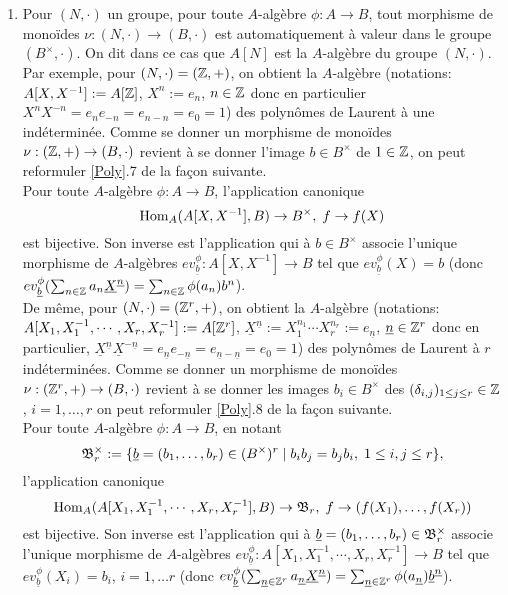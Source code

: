 \begin{enumerate}[leftmargin=* ,parsep=0cm,itemsep=0cm,topsep=0cm]
 
 \item Pour $(N,\cdot)$ un groupe, pour toute $A$-algèbre $\phi:A\rightarrow B$, tout morphisme de monoïdes $\nu:(N,\cdot)\rightarrow (B,\cdot)$ est automatiquement à valeur dans le groupe $(B^\times,\cdot)$. On dit dans ce cas que $ A[N]$ est la $A$-algèbre du groupe $(N,\cdot)$.\\
 
  Par exemple, pour $(N,\cdot)=(\mathbb{Z},+)$, on obtient la $A$-algèbre (notations:  $A[X,X^{-1}]:=A[\mathbb{Z}]$, $X^n:=e_n$, $n\in \mathbb{Z}$ donc en particulier $X^nX^{-n}=e_ne_{-n}=e_{n-n}=e_0=1$) des polynômes de Laurent à une indéterminée. Comme se donner    un morphisme de monoïdes $\nu:(\mathbb{Z},+)\rightarrow (B ,\cdot)$ revient à se donner l'image  $b \in B^\times $ de $1\in \mathbb{Z}$, on peut reformuler \ref{Poly}.7 de la fa\c{c}on suivante.\\

   Pour toute $A$-algèbre $\phi:A\rightarrow B$,  l'application canonique
$$\hbox{\rm Hom}_A(A[X,X^{-1}],B)\rightarrow B^\times,\; f\rightarrow f(X)$$
 est bijective. Son inverse est l'application qui à $b \in B^\times$ associe l'unique morphisme de $A$-algèbres $ev_{\underline{b}}^\phi:A[X,X^{-1}]\rightarrow B$ tel que $ev_{\underline{b}}^\phi(X)=b$ (donc $ev_{\underline{b}}^\phi(\sum_{n\in \mathbb{Z}}a_n\underline{X}^{\underline{n}})=\sum_{n\in \mathbb{Z}}\phi(a_n)b^n$).\\ 
 
  De même, pour $(N,\cdot)=(\mathbb{Z}^r,+)$, on obtient la $A$-algèbre (notations:  $A[X_1,X_1^{-1},\cdots, X_r,X_r^{-1}]:=A[\mathbb{Z}^r]$, $\underline{X}^{\underline{n}}:=X_1^{n_1}\cdots X_r^{n_r}:=e_{\underline{n}}$, $\underline{n}\in \mathbb{Z}^r$ donc en particulier, $\underline{X}^{\underline{n}}\underline{X}^{-\underline{n}}= e_{\underline{n}}e_{-\underline{n}}=e_{\underline{n}-\underline{n}}=e_0=1$) des polynômes de Laurent à $r$ indéterminées. Comme se donner    un morphisme de monoïdes $\nu:(\mathbb{Z}^r,+)\rightarrow (B ,\cdot)$ revient à se donner les images $b_i \in B^\times $ des $(\delta_{i,j})_{1\leq j\leq r}\in \mathbb{Z}$, $i=1,\dots, r$ on peut reformuler \ref{Poly}.8 de la fa\c{c}on suivante.\\
 
   Pour toute $A$-algèbre $\phi:A\rightarrow B$, en notant  
 $$\frak{B}^\times_r:= \lbrace \underline{b}=(b_1,\dots, b_r)\in (B^\times)^r\;|\; b_ib_j=b_jb_i,\; 1\leq i,j\leq r\rbrace,$$  l'application canonique
$$\hbox{\rm Hom}_A(A[X_1,X_1^{-1},\cdots, X_r,X_r^{-1}],B)\rightarrow \frak{B}_r,\; f\rightarrow (f(X_1),\dots, f(X_r))$$
 est bijective. Son inverse est l'application qui à $\underline{b}=(b_1,\dots, b_r)\in \frak{B}^\times_r$ associe l'unique morphisme de $A$-algèbres $ev_{\underline{b}}^\phi:A[X_1,X_1^{-1},\cdots, X_r,X_r^{-1}]\rightarrow B$ tel que $ev_{\underline{b}}^\phi(X_i)=b_i$, $i=1,\dots r$ (donc $ev_{\underline{b}}^\phi(\sum_{\underline{n}\in \mathbb{Z}^r}a_{\underline{n}}\underline{X}^{\underline{n}})=\sum_{\underline{n}\in \mathbb{Z}^r}\phi(a_{\underline{n}})\underline{b}^{\underline{n}}$).\\

 

 \end{enumerate}

